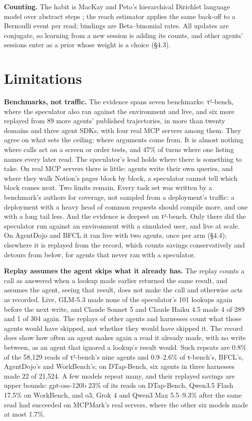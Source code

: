 \documentclass[10pt,twocolumn,letterpaper]{article}
\newcommand{\runin}[1]{{\sffamily\bfseries\color{accent}#1}}
\begin{document}
\runin{Counting.} The habit is MacKay and Peto's hierarchical Dirichlet language model over abstract steps \citep{mackay1995hierarchical}; the reach estimator applies the same back-off to a Bernoulli event per read; bindings are Beta--binomial rates. All updates are conjugate, so learning from a new session is adding its counts, and other agents' sessions enter as a prior whose weight is a choice (§4.3).

\section{Limitations}\label{limitations}

\runin{Benchmarks, not traffic.} The evidence spans seven benchmarks: τ²-bench, where the speculator also ran against the environment and live, and six more replayed from 89 more agents' published trajectories, in more than twenty domains and three agent SDKs, with four real MCP servers among them. They agree on what sets the ceiling: where arguments come from. It is almost nothing where calls act on a screen or order tests, and 47\% of turns where one listing names every later read. The speculator's lead holds where there is something to take. On real MCP servers there is little: agents write their own queries, and where they walk Notion's pages block by block, a speculator cannot tell which block comes next. Two limits remain. Every task set was written by a benchmark's authors for coverage, not sampled from a deployment's traffic: a deployment with a heavy head of common requests should compile more, and one with a long tail less. And the evidence is deepest on τ²-bench. Only there did the speculator run against an environment with a simulated user, and live at scale. On AgentDojo and BFCL it ran live with two agents, once per arm (§4.4); elsewhere it is replayed from the record, which counts savings conservatively and detours from below, for agents that never ran with a speculator.

\runin{Replay assumes the agent skips what it already has.} The replay counts a call as answered when a lookup made earlier returned the same result, and assumes the agent, seeing that result, does not make the call and otherwise acts as recorded. Live, GLM-5.3 made none of the speculator's 101 lookups again before the next write, and Claude Sonnet 5 and Claude Haiku 4.5 made 4 of 289 and 1 of 304 again. The replays of other agents and harnesses count what those agents would have skipped, not whether they would have skipped it. The record does show how often an agent makes again a read it already made, with no write between, as an agent that ignored a lookup's result would. Such repeats are 0.8\% of the 58,129 reads of τ²-bench's nine agents and 0.9--2.6\% of τ-bench's, BFCL's, AgentDojo's and WorkBench's; on DTap-Bench, six agents in three harnesses made 22 of 21,524. A few models repeat many, and their replayed savings are upper bounds: gpt-oss-120b 23\% of its reads on DTap-Bench, Qwen3.5 Flash 17.5\% on WorkBench, and o3, Grok 4 and Qwen3 Max 5.5--9.3\% after the same read had succeeded on MCPMark's real servers, where the other six models made at most 1.7\%.
\end{document}
